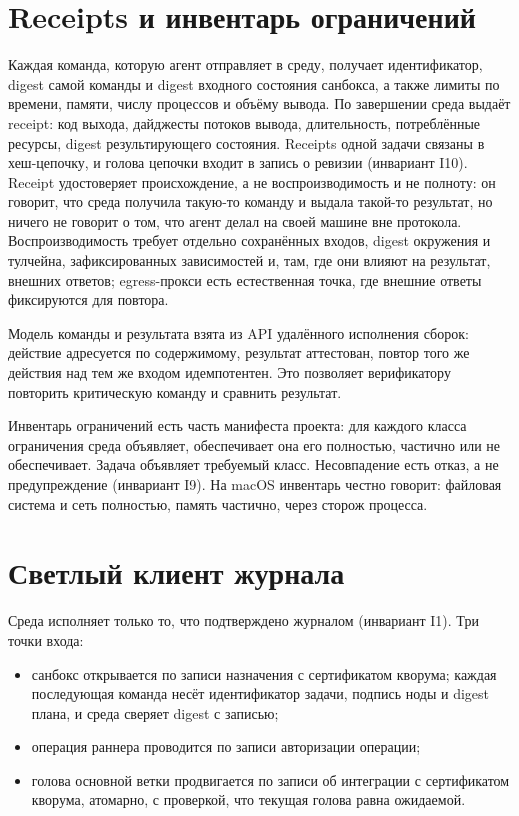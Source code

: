 \section{Receipts и инвентарь ограничений}

Каждая команда, которую агент отправляет в среду, получает идентификатор, digest самой команды и digest входного состояния санбокса, а также лимиты по времени, памяти, числу процессов и объёму вывода. По завершении среда выдаёт receipt: код выхода, дайджесты потоков вывода, длительность, потреблённые ресурсы, digest результирующего состояния. Receipts одной задачи связаны в хеш-цепочку, и голова цепочки входит в запись о ревизии (инвариант I10). Receipt удостоверяет происхождение, а не воспроизводимость и не полноту: он говорит, что среда получила такую-то команду и выдала такой-то результат, но ничего не говорит о том, что агент делал на своей машине вне протокола. Воспроизводимость требует отдельно сохранённых входов, digest окружения и тулчейна, зафиксированных зависимостей и, там, где они влияют на результат, внешних ответов; egress-прокси есть естественная точка, где внешние ответы фиксируются для повтора.

Модель команды и результата взята из API удалённого исполнения сборок: действие адресуется по содержимому, результат аттестован, повтор того же действия над тем же входом идемпотентен. Это позволяет верификатору повторить критическую команду и сравнить результат.

Инвентарь ограничений есть часть манифеста проекта: для каждого класса ограничения среда объявляет, обеспечивает она его полностью, частично или не обеспечивает. Задача объявляет требуемый класс. Несовпадение есть отказ, а не предупреждение (инвариант I9). На macOS инвентарь честно говорит: файловая система и сеть полностью, память частично, через сторож процесса.

\section{Светлый клиент журнала}

Среда исполняет только то, что подтверждено журналом (инвариант I1). Три точки входа:

\begin{itemize}
\item санбокс открывается по записи назначения с сертификатом кворума; каждая последующая команда несёт идентификатор задачи, подпись ноды и digest плана, и среда сверяет digest с записью;
\item операция раннера проводится по записи авторизации операции;
\item голова основной ветки продвигается по записи об интеграции с сертификатом кворума, атомарно, с проверкой, что текущая голова равна ожидаемой.
\end{itemize}

